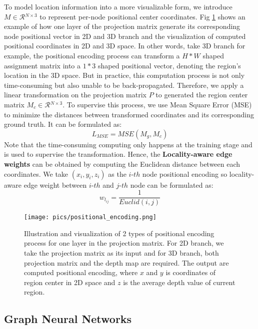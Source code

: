 ﻿\documentclass[journal]{IEEEtran}
\begin{document}
    To model location information into a more visualizable form, we introduce $M \in \mathcal{R}{^{N\times 3}}$ to represent per-node positional center coordinates. Fig \ref{fig_pos_encoding} shows an example of how one layer of the projection matrix generate its corresponding node positional vector in 2D and 3D branch and the visualization of computed positional coordinates in 2D and 3D space. In other words, take 3D branch for example, the positional encoding process can transform a $H*W$ shaped assignment matrix into a $1*3$ shaped positional vector, denoting the region's location in the 3D space. But in practice, this computation process is not only time-consuming but also unable to be back-propagated. Therefore, we apply a linear transformation on the projection matrix $P$ to generated the region center matrix ${M}_{c} \in \mathcal{R}{^{N\times 3}}$. To supervise this process, we use Mean Square Error (MSE) to minimize the distances between transformed coordinates and its corresponding ground truth. It can be formulated as:
    \begin{equation}\label{loss_mse}
    L_{MSE} = MSE(M_g, M_c)
    \end{equation} 
    Note that the time-consuming computing only happens at the training stage and is used to supervise the transformation. Hence, the \textbf{Locality-aware edge weights} can be obtained by computing the Euclidean distance between each coordinates. We take $(x_i, y_i, z_i)$ as the $i$-$th$ node positional encoding so locality-aware edge weight between $i$-$th$ and $j$-$th$ node can be formulated as:
    \begin{equation}
        w_{l_{ij}} = \frac{1}{Euclid(i, j)}
    \end{equation} 

    
    \begin{figure}
        \centering
        \texttt{[image: pics/positional\_encoding.png]}
        \caption{Illustration and visualization of 2 types of positional encoding process for one
        layer in the projection matrix. For 2D branch, we take the projection matrix as its input and for 3D branch, both projection matrix and the depth map are required. The output are computed positional encoding, where $x$ and $y$ is coordinates of region center in 2D space and $z$ is the average depth value of current region. }
        \label{fig_pos_encoding}
    \end{figure}  



\subsection{Graph Neural Networks}
 
\end{document}
